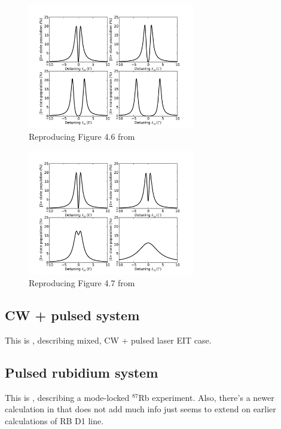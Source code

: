 \documentclass{article}
\begin{document}
\begin{spacing}{1.1}
\begin{figure}
\begin{center}
\includegraphics[width=0.65\textwidth]{figures/matt46.pdf}
\caption{Reproducing Figure 4.6 from \cite{McDonnell2003}}
\label{fig:matt46}
\end{center}
\end{figure}

\begin{figure}
\begin{center}
\includegraphics[width=0.65\textwidth]{figures/matt47.pdf}
\caption{Reproducing Figure 4.7 from \cite{McDonnell2003}}
\label{fig:matt47}
\end{center}
\end{figure}

\subsection{CW + pulsed system}
This is \cite{Soares2010}, describing mixed, CW + pulsed laser EIT case.

\subsection{Pulsed rubidium system}
This is \cite{Arissian2006}, describing a mode-locked $^{87}$Rb experiment. Also, there's a newer calculation in \cite{Aumiler2010} that does not add much info just seems to extend on earlier calculations of RB D1 line.



\end{spacing}
\end{document}
